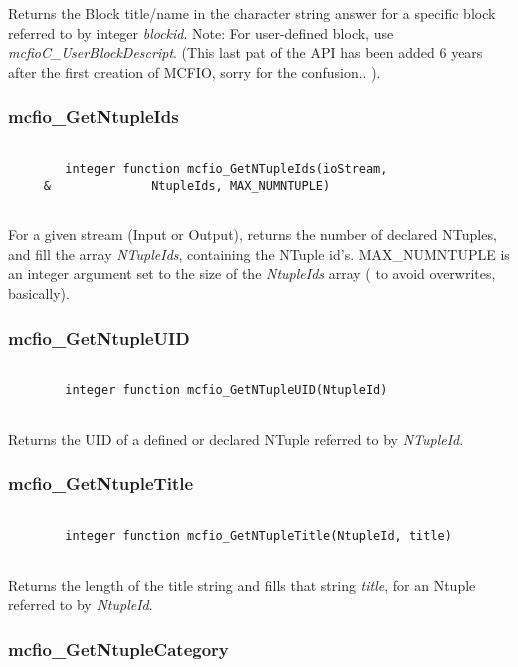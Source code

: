 Returns the Block title/name in the character string answer
for a specific block referred to by integer {\em blockid}.
Note: For user-defined block, use {\em mcfioC\_UserBlockDescript}. 
(This last pat of the API has been added 6 years after the first creation 
of MCFIO, sorry for the confusion.. ).  	  

\subsubsection{mcfio\_GetNtupleIds}

\begin{verbatim}

        integer function mcfio_GetNTupleIds(ioStream,
     &              NtupleIds, MAX_NUMNTUPLE)
     
\end{verbatim}

For a given stream (Input or Output), returns the number of declared
NTuples, and fill the array {\em NTupleIds}, containing the NTuple id's. 
MAX\_NUMNTUPLE is an integer argument set to the size of the {\em NtupleIds}
array ( to avoid overwrites, basically). 
 
	
\subsubsection{mcfio\_GetNtupleUID}

\begin{verbatim}

        integer function mcfio_GetNTupleUID(NtupleId)
        
\end{verbatim}

Returns the UID of a defined or declared NTuple referred to by {\em
NTupleId}. 
	
	
\subsubsection{mcfio\_GetNtupleTitle}

\begin{verbatim}

        integer function mcfio_GetNTupleTitle(NtupleId, title)
        
\end{verbatim}

Returns the length of the title string and fills that string {\em
title}, for an Ntuple referred to by {\em NtupleId}.

\subsubsection{mcfio\_GetNtupleCategory}

